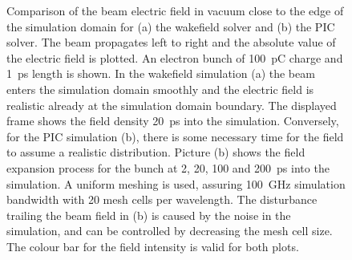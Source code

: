 \begin{figure}[!t]
\centering
{}
\hspace{2mm}



\caption{Comparison of the beam electric field in vacuum close to the edge of the simulation domain for (a) the wakefield solver and (b) the PIC solver. The beam propagates left to right and the absolute value of the electric field is plotted. An electron bunch of 100~pC charge and 1~ps length is shown. In the wakefield simulation (a) the beam enters the simulation domain smoothly and the electric field is realistic already at the simulation domain boundary. The displayed frame shows the field density 20~ps into the simulation. Conversely, for the PIC simulation (b), there is some necessary time for the field to assume a realistic distribution. Picture (b) shows the field expansion process for the bunch at 2, 20, 100 and 200~ps into the simulation. A uniform meshing is used, assuring 100~GHz simulation bandwidth with 20 mesh cells per wavelength. The disturbance trailing the beam field in (b) is caused by the noise in the simulation, and can be controlled by decreasing the mesh cell size. The colour bar for the field intensity is valid for both plots.}
\label{fig:pic_vs_wak}
\end{figure}




